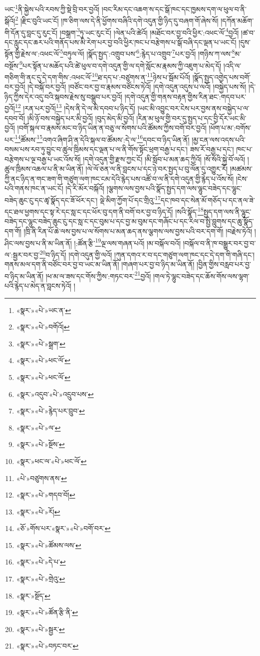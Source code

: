 ཡང་\footnote{«སྣར་»«པེ་»ཡང་ན་}ནི་སྐྱེས་པའི་རབས་ཀྱི་སྡེ་བྲི་བར་བྱའོ། །བང་རིམ་དང་འཆག་ས་དང་སྒོ་ཁང་དང་ཁྱམས་དག་ལ་ཕུལ་བ་ནི་སྒོའོ།\footnote{«སྣར་»«པེ་»བགོའོ།} །རྫིང་བུའི་ཡང་ངོ། །ཁ་ཅིག་ལས་དེ་ནི་ཕྱོགས་བཞིའི་དགེ་འདུན་གྱི་ཉིད་དུ་བཞག་གོ་ཞེས་སོ། །དཀོན་མཆོག་གི་དོན་དུ་བླང་དུ་རུང་ངོ། །བསྒྲག་\footnote{«སྣར་»«པེ་»སྒྲག་}ཏུ་ཡང་རུང་ངོ། །ལེན་པའི་ཚེའོ། །མཐོང་བར་བྱ་བའི་ཕྱིར་:འཕང་ལོ་\footnote{«སྣར་»«པེ་»ཕང་ལོ་}བྱའོ། །ཚ་བ་དང་རླུང་དང་ཆར་པའི་གནོད་པས་མི་རེག་པར་བྱ་བའི་ཕྱིར་ཁང་པ་བརྩེགས་པ་སྒོ་བཞི་དང་ལྡན་པ་ཡང་ངོ། །དུས་སྟོན་གྱི་རྗེས་ལ་:འཕང་ལོ་\footnote{«སྣར་»«པེ་»ཕང་ལོ་}བཏུལ་ལོ། །སྣོད་སྤྱད་:འགྲུབ་པས་\footnote{«སྣར་»འདུབ་«པེ་»འདྲུབ་པས་}:རྙེད་པ་འགྲུབ་\footnote{«སྣར་»«པེ་»རྙེད་པར་བྲུབ་}པར་བྱའོ། །གཉིས་ཀ་ལས་\footnote{«སྣར་»«པེ་»ལ་}མ་བསྔོས་\footnote{«སྣར་»«པེ་»སྔོས་}པར་སྟོན་པ་མཆོད་པའི་ཚེ་ཕུལ་བ་དགེ་འདུན་གྱི་ལ་དགེ་སློང་མ་རྣམས་ཀྱི་འཇུག་པ་མེད་དོ། །འདི་ལ་གཅིག་གི་ནང་དུ་དེ་དག་གིས་:འཕང་ལོ་\footnote{«སྣར་»ཕང་ལ་«པེ་»ཕང་ལོ་}ཐ་དད་པ་:བཙུགས་ན་\footnote{«པེ་»བཙུགས་ནས་}ཉེས་པ་སྦོམ་པོའོ། །སྣོད་སྤྱད་འགྱེད་པས་བགོ་བར་བྱའོ། །དེ་བསྐོ་བར་བྱའོ། །བཙོང་བར་བྱ་བ་རྣམས་བཙོངས་ཏེའོ། །དགེ་འདུན་འདུས་པ་ལའོ། །བསྐྱེད་པས་སོ། །དེ་ཉིད་ཀྱིས་དེར་འདུ་བའི་སྐབས་རྗེས་སུ་བསྒྲུབ་པར་བྱའོ། །དགེ་འདུན་གྱི་གནས་བརྟན་གྱིས་རིན་ཐང་:གདབ་པར་བྱའོ།\footnote{«སྣར་»«པེ་»གདབ་བོ།} །རན་པར་བྱའོ།\footnote{«སྣར་»«པེ་»རོ།} །དེས་ནི་དེ་ལ་མི་དབབ་པ་ཉིད་དོ། །ཡང་མི་འབྱུང་བར་ངེས་པར་བྱས་ནས་བསྐྱེད་པ་ལ་དབབ་བོ། །མི་ཉོ་བས་བསྐྱེད་པར་མི་བྱའོ། །བུད་མེད་མི་བྱའོ། །རིན་མ་ཕུལ་གྱི་བར་དུ་སྤྱད་པ་དང་བྱི་དོར་ཡང་མི་བྱའོ། །བགོ་སྐལ་བ་རྣམས་མང་བ་ཉིད་ཡིན་ན་བཅུ་ལ་སོགས་པའི་ཚོམས་ཀྱིས་བགོ་བར་བྱའོ། །ཕོག་པ་མ་:བགོས་པར་\footnote{«ཅོ་»གོས་པར་«སྣར་»«པེ་»བགོ་བར་}ཚོམས་\footnote{«སྣར་»«པེ་»ཚོམས་ལས་}འགའ་ཞིག་ཤི་ན་དེའི་སྐལ་བ་ཚོམས་:དེ་ལ་\footnote{«སྣར་»«པེ་»དེ་པ་}དབང་བ་ཉིད་ཡིན་ནོ། །མྱ་ངན་ལས་འདས་པའི་བསམ་པས་རབ་ཏུ་བྱུང་བ་ཚུལ་ཁྲིམས་དང་ལྡན་པ་ལ་ནི་གོས་སྟོང་ཕྲག་བརྒྱ་པ་དང་། ཟས་རོ་བརྒྱ་པ་དང་། ཁང་པ་བརྩེགས་པ་ལྔ་བརྒྱ་པ་ཡང་འོས་སོ། །དགེ་འདུན་གྱི་རྫས་ཀྱང་ངོ། །མི་སློབ་པ་མན་ཆད་ཀྱིའོ། །སོ་སོའི་སྐྱེ་བོ་ལའོ། །ཚུལ་ཁྲིམས་འཆལ་པ་ནི་མ་ཡིན་ནོ། །ལེ་ལོ་ཅན་ལ་ནི་བླངས་པ་དང་ཉེ་བར་སྤྱད་པ་བུ་ལོན་དུ་འགྱུར་རོ། །མཚམས་ཀྱི་ནང་ཉིད་ན་གང་ཟག་གི་གཙུག་ལག་ཁང་ངམ་དེའི་རྙེད་པས་འཚོ་བ་ལ་ནི་དགེ་འདུན་གྱི་རྙེད་པ་འོས་སོ། །ངེས་པའི་གནས་ཁང་ན་ཡང་ངོ། །དེ་རི་མོར་བསྐོའོ། །ལྕགས་ལས་བྱས་པའི་སྣོད་སྤྱད་དག་ལས་ལྷུང་བཟེད་དང་ལྷུང་བཟེད་ཆུང་ངུ་དང་ཚྭ་སྣོད་དང་ཟོ་ཕོར་དང་། ལྡེ་མིག་ཀྱོག་པོ་དང་གྲིའུ་\footnote{«སྣར་»«པེ་»གྲེའུ་}དང་ཁབ་དང་སེན་མོ་གཅོད་པ་དང་ནལ་ཟེ་དང་ཐལ་ཕྱགས་དང་སྟ་རེ་དང་སླ་ང་དང་ཕོར་བུ་དག་ནི་བགོ་བར་བྱ་བ་ཉིད་དོ། །སའི་སྣོད་\footnote{«སྣར་»སྔོད་}སྤྱད་དག་ལས་ནི་ལྷུང་བཟེད་དང་ལྷུང་བཟེད་ཆུང་ངུ་དང་སླ་ང་དང་བུམ་པ་དང་བྱ་མ་བུམ་དང་གཞོང་པ་དང་རིལ་བ་སྤྱི་བླུགས་དང་ཆུ་སྣོད་དག་གོ། །ཁྲི་ནི་རིན་པོ་ཆེ་ལས་བྱས་པ་ལ་སོགས་པ་མན་ཆད་ནས་ལྕགས་ལས་བྱས་པའི་བར་དག་གོ། །བརྗེས་ཏེའོ། །ཤིང་ལས་བྱས་པ་ནི་མ་ཡིན་ནོ། །:ཚོན་རྩི་\footnote{«སྣར་»«པེ་»ཚོན་རྩི་ནི་}ལྔ་ལས་གཞན་པའོ། །མ་བསྐོལ་བའོ། །བསྐོལ་བ་ནི་ཁ་བསྒྱུར་བར་བྱ་བ་ལ་:སྦྱར་བར་བྱ་\footnote{«སྣར་»«པེ་»སྦྱར་}བ་ཉིད་དོ། །དགེ་འདུན་གྱི་ལའོ། །ཀུན་དགའ་ར་བ་དང་གཙུག་ལག་ཁང་དང་དེ་དག་གི་གཞི་དང་། གནས་མལ་དག་ནི་བཙོང་བར་བྱ་བ་ཡང་མ་ཡིན་ནོ། །གཞག་པར་བྱ་བ་ཉིད་མ་ཡིན་ནོ། །བྱིན་གྱིས་བརླབ་པར་བྱ་བ་ཉིད་མ་ཡིན་ནོ། །ཕ་མ་ལ་ཟས་དང་གོས་ཀྱིས་:གཏང་བར་\footnote{«སྣར་»«པེ་»བཏང་བར་}བྱའོ། །གལ་ཏེ་ལྷུང་བཟེད་དང་ཆོས་གོས་ལས་ལྷག་པའི་རྙེད་པ་མེད་ན་བླངས་ཏེའོ། །
